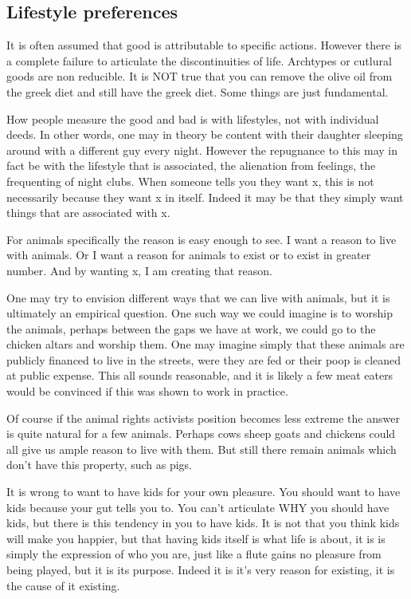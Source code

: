 \documentclass[12pt]{report}
\numberwithin{equation}{section}
\begin{document}
\subsection{Lifestyle preferences}

It is often assumed that good is attributable to specific actions. However there is a complete failure to articulate the discontinuities of life. Archtypes or cutlural goods are non reducible. It is NOT true that you can remove the olive oil from the greek diet and still have the greek diet. Some things are just fundamental. 

How people measure the good and bad is with lifestyles, not with individual deeds. In other words, one may in theory be content with their daughter sleeping around with a different guy every night. However the repugnance to this may in fact be with the lifestyle that is associated, the alienation from feelings, the frequenting of night clubs. When someone tells you they want 
 x, this is not necessarily because they want x in itself. Indeed it may be that they simply want things that are associated with x. 

For animals specifically the reason is easy enough to see. I want a reason to live with animals. Or I want a reason for animals to exist or to exist in greater number. And by wanting x, I am creating that reason. 

One may try to envision different ways that we can live with animals, but it is ultimately an empirical question. One such way we could imagine is to worship the animals, perhaps between the gaps we have at work, we could go to the chicken altars and worship them. One may imagine simply that these animals are publicly financed to live in the streets, were they are fed or their poop is cleaned at public expense. This all sounds reasonable, and it is likely a few meat eaters would be convinced if this was shown to work in practice.

Of course if the animal rights activists position becomes less extreme the answer is quite natural for a few animals. Perhaps cows sheep goats and chickens could all give us ample reason to live with them. But still there remain animals which don't have this property, such as pigs. 

It is wrong to want to have kids for your own pleasure. You should want to have kids because your gut tells you to. You can't articulate WHY you should have kids, but there is this tendency in you to have kids. It is not that you think kids will make you happier, but that having kids itself is what life is about, it is is simply the expression of who you are, just like a flute gains no pleasure from being played, but it is its purpose. Indeed it is it's very reason for existing, it is the cause of it existing. 
\end{document}
